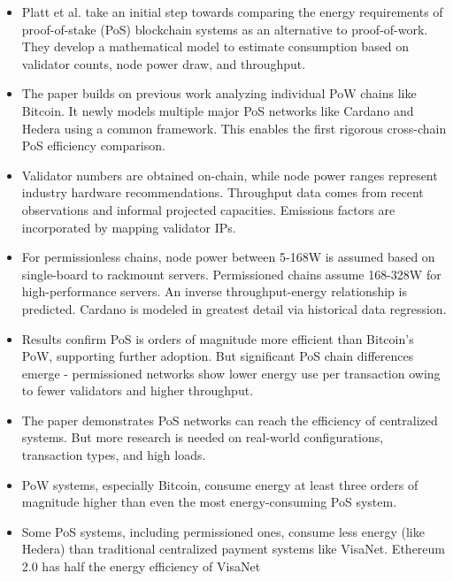 \documentclass{article}
\begin{document}
\begin{itemize}
    \item Platt et al. take an initial step towards comparing the energy requirements of proof-of-stake (PoS) blockchain systems as an alternative to proof-of-work. They develop a mathematical model to estimate consumption based on validator counts, node power draw, and throughput.
    \item The paper builds on previous work analyzing individual PoW chains like Bitcoin. It newly models multiple major PoS networks like Cardano and Hedera using a common framework. This enables the first rigorous cross-chain PoS efficiency comparison.
    \item Validator numbers are obtained on-chain, while node power ranges represent industry hardware recommendations. Throughput data comes from recent observations and informal projected capacities. Emissions factors are incorporated by mapping validator IPs.
    \item For permissionless chains, node power between 5-168W is assumed based on single-board to rackmount servers. Permissioned chains assume 168-328W for high-performance servers. An inverse throughput-energy relationship is predicted. Cardano is modeled in greatest detail via historical data regression.
    \item Results confirm PoS is orders of magnitude more efficient than Bitcoin's PoW, supporting further adoption. But significant PoS chain differences emerge - permissioned networks show lower energy use per transaction owing to fewer validators and higher throughput.
    \item The paper demonstrates PoS networks can reach the efficiency of centralized systems. But more research is needed on real-world configurations, transaction types, and high loads.
    \item PoW systems, especially Bitcoin, consume energy at least three orders of magnitude higher than even the most energy-consuming PoS system.
    \item Some PoS systems, including permissioned ones, consume less energy (like Hedera) than traditional centralized payment systems like VisaNet. Ethereum 2.0 has half the energy efficiency of VisaNet

\end{itemize}
\end{document}

